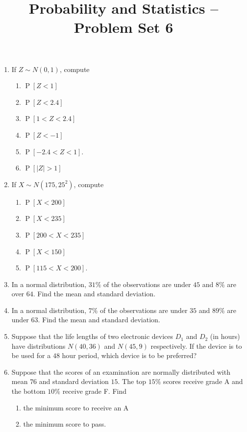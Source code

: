 \documentclass[svgnames]{amsart}
\title[]{Probability and Statistics -- Problem Set 6}
\DeclareMathOperator{\Prob}{P}
\begin{document}
\maketitle
\begin{enumerate}[leftmargin=*]
\item If $Z \sim N(0,1)$, compute
\begin{enumerate}
	\item $\Prob[Z < 1]$
	\item $\Prob[Z < 2.4]$
	\item $\Prob[1 < Z < 2.4]$
	\item $\Prob[Z < -1]$
	\item $\Prob[-2.4 < Z < 1]$.
	\item $\Prob[|Z| > 1]$
\end{enumerate}

\item If $X \sim N(175, 25^2)$, compute
\begin{enumerate}
	\item $\Prob[X < 200]$
	\item $\Prob[X < 235]$
	\item $\Prob[200 < X < 235]$
	\item $\Prob[X < 150]$
	\item $\Prob[115 < X < 200]$.
\end{enumerate}

\item In a normal distribution, $31\%$ of the observations are under $45$ and $8\%$ are over $64$. Find the mean and standard deviation.

\item In a normal distribution, $7\%$ of the observations are under $35$ and $89\%$ are under $63$. Find the mean and standard deviation.

\item Suppose that the life lengths of two electronic devices $D_1$ and $D_2$ (in hours) have distributions $N(40, 36)$ and $N(45, 9)$ respectively. If the device is to be used for a $48$ hour period, which device is to be preferred?

\item Suppose that the scores of an examination are normally distributed with mean $76$ and standard deviation $15$. The top $15\%$ scores receive grade A and the bottom $10\%$ receive grade F. Find
\begin{enumerate}
	\item the minimum score to receive an A
	\item the minimum score to pass.
\end{enumerate}


\end{enumerate}
\end{document}
